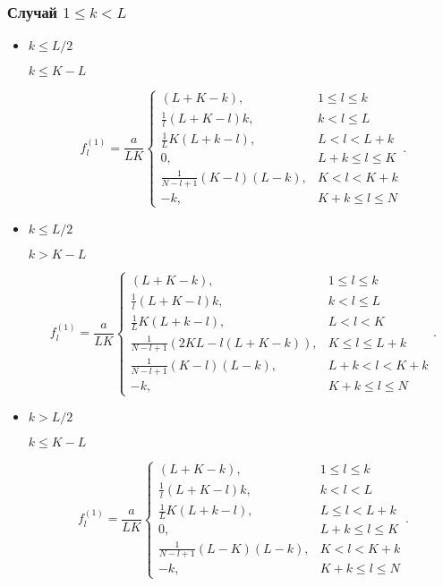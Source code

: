 \documentclass[specialist,
               substylefile = spbu.rtx,
               subf,href,colorlinks=true, 12pt]{disser}
\begin{document}
\subsubsection{Случай $1 \leq k < L$}
\begin{itemize}
\item
$k \leq L/2$

$k \leq K - L$

$$f^{(1)}_l = \frac{a}{{LK}}
\begin{cases}
	(L + K - k), & \text{$1 \leq l \leq k$}\\
	\frac{1}{l}(L + K - l)k, & \text{$k < l \leq L$}\\
	\frac{1}{L}K(L + k - l), &\text{$L < l < L + k$}\\
	0, &\text{$L + k \leq l \leq K$}\\
	\frac{1}{N - l + 1}(K - l)(L - k), &\text{$K < l < K + k$}\\
	-k, &\text{$K + k \leq l \leq N $}
\end{cases}.
$$

\item
$k \leq L/2$

$k > K - L$

$$f^{(1)}_l = \frac{a}{{LK}}
\begin{cases}
	(L + K - k), & \text{$1 \leq l \leq k$}\\
	\frac{1}{l}(L + K - l)k, & \text{$k < l \leq L$}\\
	\frac{1}{L}K(L + k- l), &\text{$L < l < K$}\\
	\frac{1}{N - l + 1}(2KL - l(L + K - k)), &\text{$K \leq l \leq L + k$}\\
	\frac{1}{N - l + 1}( K - l)(L - k), &\text{$L + k < l < K + k$}\\
	-k, &\text{$K + k \leq l \leq N$}
\end{cases}.
$$

\item
$k > L/2$

$k \leq K - L$

$$f^{(1)}_l = \frac{a}{{LK}}
\begin{cases}
	(L + K - k), & \text{$1 \leq l \leq k$}\\
	\frac{1}{l}(L + K - l)k, & \text{$k < l < L$}\\
	\frac{1}{L}K(L + k - l), &\text{$L \leq l < L + k$}\\
	0, &\text{$L + k \leq l \leq K$}\\
	\frac{1}{N - l + 1}(L - K)(L - k), &\text{$K < l < K + k$}\\
	-k, &\text{$K + k \leq l \leq N$}
\end{cases}.
$$


\end{itemize}
\end{document}
